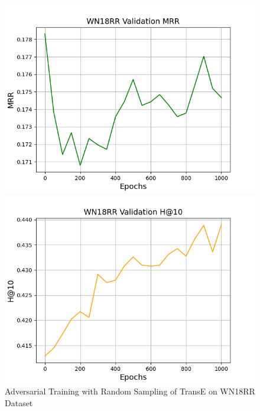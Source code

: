 \begin{figure}
\begin{minipage}{.5\textwidth}
    \end{minipage}
    \begin{minipage}{.5\textwidth}
      \centering
      \includegraphics[width=0.9\linewidth]{figures/results/WN18RR/AdversarialTraining/Random/gan_train_wn18rr_mrr.png}
   \end{minipage}%
    \begin{minipage}{.5\textwidth}
      \centering
      \includegraphics[width=0.9\linewidth]{figures/results/WN18RR/AdversarialTraining/Random/gan_train_wn18rr_hit10.png}
    \end{minipage}%
    \caption{Adversarial Training with Random Sampling of TransE on WN18RR Dataset}
    \label{fig:test}
\end{figure}

\pagebreak

